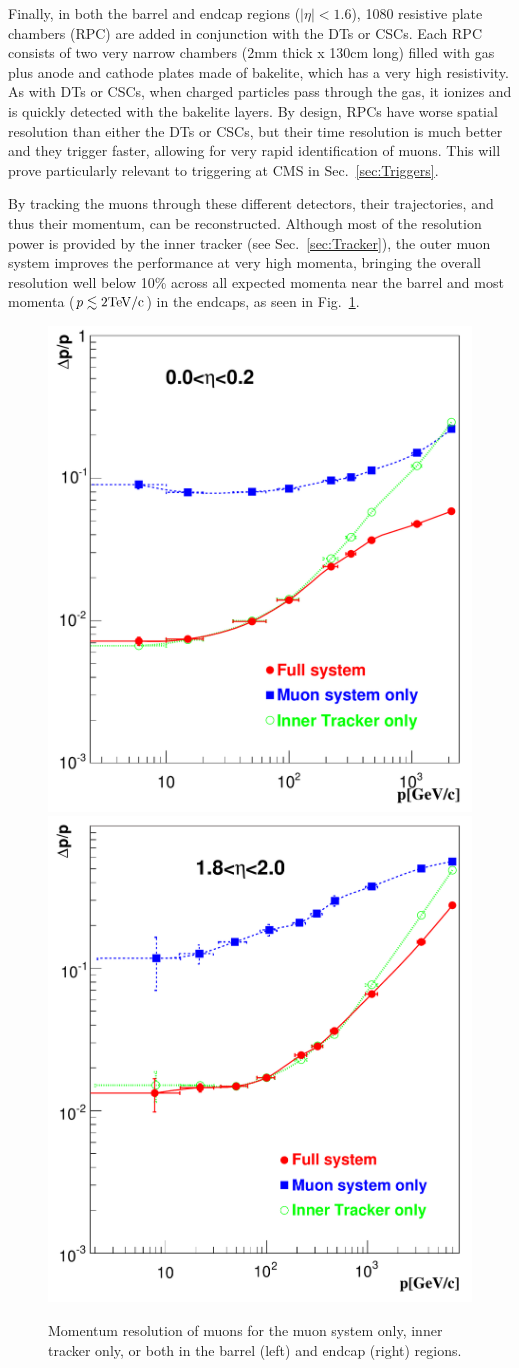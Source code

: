 Finally, in both the barrel and endcap regions ($|\eta|<1.6$), 1080 resistive plate chambers (RPC) are added in conjunction with the DTs or CSCs. Each RPC consists of two very narrow chambers (2mm thick x 130cm long) filled with gas plus anode and cathode plates made of bakelite, which has a very high resistivity. As with DTs or CSCs, when charged particles pass through the gas, it ionizes and is quickly detected with the bakelite layers. By design, RPCs have worse spatial resolution than either the DTs or CSCs, but their time resolution is much better and they trigger faster, allowing for very rapid identification of muons. This will prove particularly relevant to triggering at CMS in Sec.~\ref{sec:Triggers}.

By tracking the muons through these different detectors, their trajectories, and thus their momentum, can be reconstructed. Although most of the resolution power is provided by the inner tracker (see Sec.~\ref{sec:Tracker}), the outer muon system improves the performance at very high momenta, bringing the overall resolution well below 10\% across all expected momenta near the barrel and most momenta ($p \lesssim 2 \rm{TeV}/c$) in the endcaps, as seen in Fig.~\ref{fig:MuonMomentumResolution}.

\begin{figure}[htbp]
\begin{center}
\includegraphics[width=.45\linewidth]{Experiment/figures/MuonMomentumResolution_smalleta.pdf}
\includegraphics[width=.45\linewidth]{Experiment/figures/MuonMomentumResolution_higheta.pdf}
\caption[Muon Momentum Resolution at CMS]{Momentum resolution of muons for the muon system only, inner tracker only, or both in the barrel (left) and endcap (right) regions.}
\label{fig:MuonMomentumResolution}
\end{center}
\end{figure}

